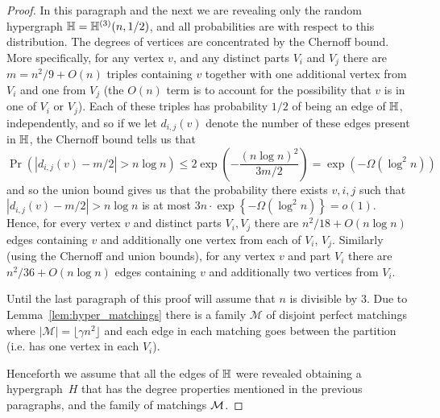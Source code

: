 \documentclass[12pt,reqno]{amsart}
\begin{document}
\begin{proof}
In this paragraph and the next we are revealing only the random hypergraph $\mathbb{H} = \mathbb{H}^{({3})}(n,1/2)$, and all probabilities are with respect to this distribution. The degrees of vertices are concentrated by the Chernoff bound. More specifically, for any vertex $v$, and any distinct parts $V_i$ and  $V_j$ there are $m={n^2}/{9} +O(n)$ triples containing $v$ together with one additional vertex from $V_i$ and one from $V_j$ (the $O(n)$ term is to account for the possibility that $v$ is in one of $V_i$ or $V_j$). Each of these triples has probability $1/2$ of being an edge of $\mathbb{H}$, independently, and so if we let $d_{i,j}(v)$ denote the number of these edges present in $\mathbb{H}$, the Chernoff bound tells us that 
\[
\Pr(|d_{i,j}(v) - m/2| > n \log n) \le 2 \exp \left( -\frac{(n \log n)^2 }{3m/2} \right) =  \exp \left( - \Omega( \log^2 n )\right)
\]
and so the union bound gives us that the probability there exists $v, i, j$ such that $|d_{i,j}(v) - m/2| > n\log n$ is at most  $3n \cdot \exp \left\{ - \Omega( \log^2 n )\right\}= o(1)$.
Hence, \whp for every vertex $v$ and distinct parts $V_i, V_j$ there are ${n^2}/{18} + O(n \log n)$ edges containing $v$ and additionally one vertex from each of $V_i$, $V_j$. Similarly (using the Chernoff and union bounds), \whp for any vertex $v$ and part $V_i$ there are ${n^2}/{36} + O(n \log n)$ edges containing $v$ and additionally two vertices from $V_i$. 

Until the last paragraph of this proof will assume that $n$ is divisible by 3.
Due to Lemma~\ref{lem:hyper_matchings} there is \whp a family $\mathcal{M}$ of disjoint perfect matchings where $|\mathcal{M}|=\lfloor \gamma n^2\rfloor$ and each edge in each matching goes between the partition (i.e. has one vertex in each $V_i$). 

Henceforth we assume that all the edges of $\mathbb{H}$ were revealed obtaining a hypergraph~$H$ that has the degree properties mentioned in the previous paragraphs, and the family of matchings $\mathcal{M}$. 


\end{proof}
\end{document}
